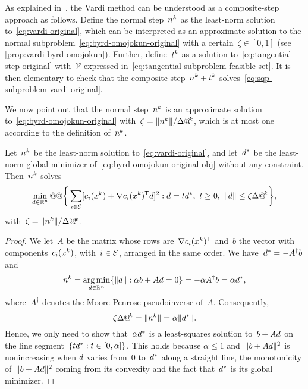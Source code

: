 As explained in~\cite[\S~15.4.1]{Conn_Gould_Toint_2000}, the Vardi method can be understood as a composite-step approach as follows.
Define the normal step~$\nstep[k]$ as the least-norm solution to~\cref{eq:vardi-original}, which can be interpreted as an approximate solution to the normal subproblem~\cref{eq:byrd-omojokun-original} with a certain~$\zeta \in [0, 1]$ (see \cref{prop:vardi-byrd-omojokun}).
Further, define~$\tstep[k]$ as a solution to~\cref{eq:tangential-step-original} with~$\mathcal{V}$ expressed in~\cref{eq:tangential-subproblem-feasible-set}.
It is then elementary to check that the composite step~$\nstep[k] + \tstep[k]$ solves~\cref{eq:sqp-subproblem-vardi-original}.

We now point out that the normal step~$\nstep[k]$ is an approximate solution to~\cref{eq:byrd-omojokun-original} with~$\zeta = \norm{\nstep[k]} / \rad[k]$, which is at most one according to the definition of~$\nstep[k]$.

\begin{proposition}
    \label{prop:vardi-byrd-omojokun}
    Let~$\nstep[k]$ be the least-norm solution to~\cref{eq:vardi-original}, and let~$\step[\ast]$ be the least-norm global minimizer of~\cref{eq:byrd-omojokun-original-obj} without any constraint.
    Then~$\nstep[k]$ solves
    \begin{equation*}
        \min_{\step \in \R^n} @@ \set[\bigg]{\sum_{i \in \ieq} [\con{i}(\iter[k]) + \nabla \con{i}(\iter[k])^{\T} \step]^2 : \step = t \step[\ast], ~ t \ge 0, ~ \norm{d} \le \zeta \rad[k]},
    \end{equation*}
    with~$\zeta = \norm{\nstep[k]} / \rad[k]$.
\end{proposition}

\begin{proof}
    We let~$A$ be the matrix whose rows are~$\nabla \con{i}(\iter[k])^{\T}$ and~$b$ the vector with components~$\con{i}(\iter[k])$, with~$i \in \mathcal{E}$, arranged in the same order.
    We have~$\step[\ast] = -A^{\dagger} b$ and
    \begin{equation*}
        \nstep[k] = \argmin_{\step \in \R^n} \set{\norm{\step} : \alpha b + A \step = 0} = -\alpha A^{\dagger} b = \alpha \step[\ast],
    \end{equation*}
    where~$A^{\dagger}$ denotes the Moore-Penrose pseudoinverse of~$A$.
    Consequently,
    \begin{equation*}
        \zeta \rad[k] = \norm{\nstep[k]} = \alpha \norm{\step[\ast]}.
    \end{equation*}
    Hence, we only need to show that~$\alpha \step[\ast]$ is a least-squares solution to~$b + A \step$ on the line segment~$\set{t \step[\ast] : t \in [0, \alpha]}$.
    This holds because $\alpha \le 1$ and~$\norm{b + A \step}^2$ is nonincreasing when $\step$ varies from~$0$ to~$\step[\ast]$ along a straight line, the monotonicity of~$\norm{b + A \step}^2$ coming from its convexity and the fact that~$\step[\ast]$ is its global minimizer.
\end{proof}

